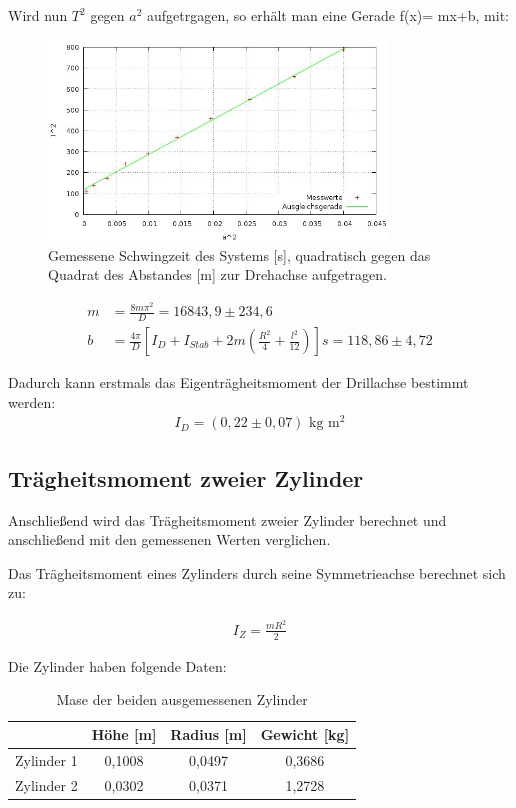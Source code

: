 Wird nun $T^2$ gegen $a^2$ aufgetrgagen, so erhält man eine Gerade f(x)= mx+b, mit:
\begin{figure}[htbp]
\includegraphics[width=0.8\textwidth]{pics/eigentr.jpg}
\caption{Gemessene Schwingzeit des Systems [s], quadratisch gegen das Quadrat des Abstandes [m] zur Drehachse aufgetragen.}
\end{figure}
\begin{align*}
 m&=\frac{8m\pi^2}{D}=16843,9 \pm 234,6\\
b&=\frac{4\pi}{D}  \left[  I_D+I_{Stab}+2m\left(\frac{R^2}{4}+\frac{l^2}{12}\right)\right]s=118,86 \pm 4,72
\end{align*}

Dadurch kann erstmals das Eigenträgheitsmoment der Drillachse bestimmt werden:
\begin{align*}
I_D=(0,22 \pm 0,07) \text{ kg m$^2$}
\end{align*}

\subsection{Trägheitsmoment zweier Zylinder}
Anschließend wird das Trägheitsmoment zweier Zylinder berechnet und anschließend mit den gemessenen Werten verglichen.

Das Trägheitsmoment eines Zylinders durch seine Symmetrieachse berechnet sich zu:

\begin{align}
I_{Z}=\frac{mR^2}{2}
\label{eq_Izyl}
\end{align}

Die Zylinder haben folgende Daten:
\begin{table}[htbp]
\begin{tabular}{|c|c|c|c|}
\hline 
 & Höhe [m] & Radius [m] & Gewicht [kg]\\ 
\hline 
Zylinder 1 & 0,1008 & 0,0497 & 0,3686 \\ 
\hline 
Zylinder 2 & 0,0302 & 0,0371 & 1,2728 \\ 
\hline 
\end{tabular} 
\caption{Mase der beiden ausgemessenen Zylinder}
\end{table}

